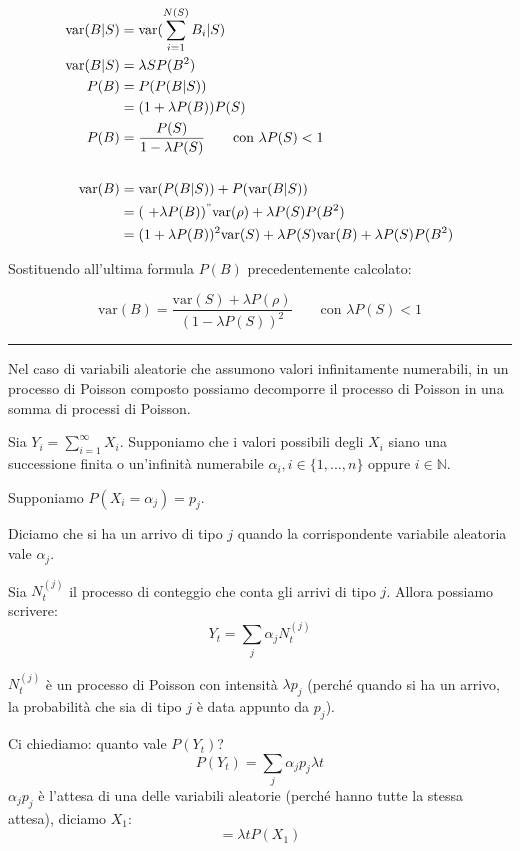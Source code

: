 \documentclass[a4paper,12pt]{book}
\begin{document}
\begin{align*}
	\text{var}(B|S) & = \text{var}(\sum_{i=1}^{N(S)} B_i | S) \\
	\text{var}(B|S) & =  \lambda S P(B^2) \\
	P(B) & = P(P(B|S)) \\
	& = (1 + \lambda P(B)) P(S) \\
	P(B) & = \frac{P(S)}{1 - \lambda P(S)} \qquad \text{con }\lambda P(S) < 1 \\
	\\
	\text{var}(B) & = \text{var}(P(B|S)) + P(\text{var}(B|S)) \\
	& = (\ + \lambda P(B))^" \text{var}(\rho) + \lambda P(S) P(B^2) \\
	& = (1 + \lambda P(B))^2 \text{var}(S) + \lambda P(S) \text{var}(B) + \lambda P(S)	 P(B^2)
\end{align*}

Sostituendo all'ultima formula $ P(B) $ precedentemente calcolato:

$$ \text{var}(B) = \frac{\text{var}(S) + \lambda P(\rho)}{(1 - \lambda P(S))^2} \qquad \text{con } \lambda P(S) < 1 $$ %
\vspace{1cm}
\hrule
\vspace{1cm}
Nel caso di variabili aleatorie che assumono valori infinitamente numerabili, in un processo di Poisson composto possiamo decomporre il processo di Poisson in una somma di processi di Poisson.

Sia $ Y_i = \sum_{i=1}^{\infty} X_i $. Supponiamo che i valori possibili degli $ X_i $ siano una successione finita o un'infinità numerabile $\alpha_i, i \in \{1, ..., n\}$ oppure $ i \in \mathbb{N} $.

Supponiamo $ P(X_i = \alpha_j) = p_j $.

Diciamo che si ha un arrivo di tipo $ j $ quando la corrispondente variabile aleatoria vale $ \alpha_{j} $. 

Sia $ N_t^{(j)} $ il processo di conteggio che conta gli arrivi di tipo $ j $. Allora possiamo scrivere:
$$ Y_t = \sum_{j} \alpha_{j} N_t^{(j)} $$

$ N_t^{(j)} $ è un processo di Poisson con intensità $\lambda p_j$ (perché quando si ha un arrivo, la probabilità che sia di tipo $ j $ è data appunto da $ p_j $). 

Ci chiediamo: quanto vale $ P(Y_t) $?
$$ P(Y_t) = \sum_{j}\alpha_{j} p_j \lambda t$$
$\alpha_{j} p_j$ è l'attesa di una delle variabili aleatorie (perché hanno tutte la stessa attesa), diciamo $ X_1 $:
$$ = \lambda t P(X_1) $$
\end{document}
